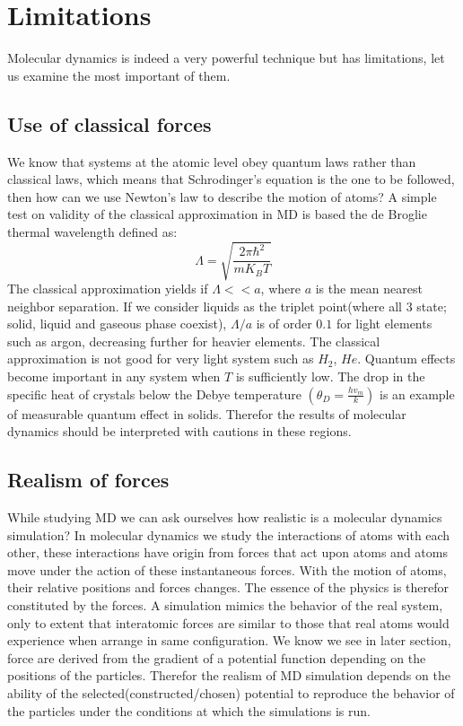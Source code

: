 \documentclass[a4paper]{article}
\begin{document}
\section{Limitations}
Molecular dynamics is indeed a very powerful technique but has limitations, let us examine the most important of them. 
\subsection{Use of classical forces}
We know that systems at the atomic level obey quantum laws rather than classical laws, which means that Schrodinger's equation is the one to be followed, then how can we use Newton's law to describe the motion of atoms? A simple test on validity of the classical approximation in MD is based the de Broglie thermal wavelength defined as:
\begin{equation}
\Lambda = \sqrt{\frac{2\pi \hbar ^2}{mK_B T}}
\end{equation}
The classical approximation yields if $\Lambda << a$, where $a$ is the mean nearest neighbor separation. If we  consider liquids as the triplet point(where all 3 state; solid, liquid and gaseous phase coexist), $\Lambda/a$ is of order $0.1$ for light elements such as argon, decreasing further for heavier elements. The classical approximation is not good for very light system such as $H_2$, $He$. Quantum effects become important in any system when $T$ is sufficiently low. The drop in the specific heat of crystals below the Debye temperature $(\theta_D = \frac{h v_m}{k})$ is an example of measurable quantum effect in solids. Therefor the results of molecular dynamics should be interpreted with cautions in these regions. 
\subsection{Realism of forces}
While studying MD we can ask ourselves how realistic is a molecular dynamics simulation? In molecular dynamics we study the interactions of atoms with each other, these interactions have origin from forces that act upon atoms and atoms move under the action of these instantaneous forces. With the motion of atoms, their relative positions and forces changes. The essence of the physics is therefor constituted by the forces. A simulation mimics the behavior of the real system, only to extent that interatomic forces are similar to those that real atoms would experience when arrange in same configuration. We know we see in later section, force are derived from the gradient of a potential function depending on the positions of the particles. Therefor the realism of MD simulation depends on the ability of the selected(constructed/chosen) potential to reproduce the behavior of the particles under the conditions at which the simulations is run. 
\end{document}
